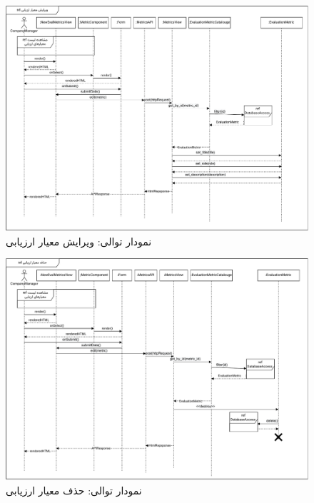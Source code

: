 \eject \pdfpagewidth=12in \pdfpageheight=11in

\begin{figure}[ht!]
	\centering
	\includegraphics[scale=0.8]{figs/design-sequence/3-28.pdf}
	\caption{نمودار توالی: ویرایش معیار ارزیابی}
\end{figure}
\FloatBarrier
\newpage

\eject \pdfpagewidth=12in \pdfpageheight=11in
\begin{figure}[ht!]
	\centering
	\includegraphics[scale=0.8]{figs/design-sequence/3-29.pdf}
	\caption{نمودار توالی: حذف معیار ارزیابی}
\end{figure}
\FloatBarrier
\newpage

\eject \pdfpagewidth=10in \pdfpageheight=9in

